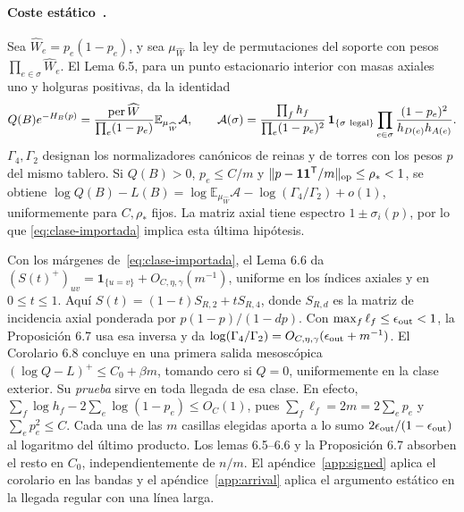 \paragraph{Coste estático~\cite[lemas 6.5--6.6, prop.~6.7 y cor.~6.8]{tc}.}
Sea \(\widehat W_e=p_e(1-p_e)\), y sea \(\mu_{\widehat W}\) la ley de permutaciones
del soporte con pesos \(\prod_{e\in\sigma}\widehat W_e\). El Lema 6.5, para un punto
estacionario interior con masas axiales uno y holguras positivas, da la identidad
\[
 Q(B)e^{-H_B(p)}=\frac{\operatorname{per}\widehat W}{\prod_e(1-p_e)}
                  \mathbb E_{\mu_{\widehat W}}\mathcal A,\qquad
 \mathcal A(\sigma)=
 \frac{\prod_f h_f}{\prod_e(1-p_e)^2}\,\mathbf1_{\{\sigma\ {\rm legal}\}}
 \prod_{e\in\sigma}\frac{(1-p_e)^2}{h_{D(e)}h_{A(e)}} .
\]
\(\Gamma_4,\Gamma_2\) designan los normalizadores canónicos de reinas y de torres con
los pesos \(p\) del mismo tablero. Si \(Q(B)>0\), \(p_e\le C/m\) y
\(\|p-\mathbf1\mathbf1^{\mathsf T}/m\|_{\rm op}\le\rho_*<1\), se obtiene
\(\log Q(B)-L(B)=\log\mathbb E_{\mu_{\widehat W}}\mathcal A
-\log(\Gamma_4/\Gamma_2)+o(1)\), uniformemente para \(C,\rho_*\) fijos.
La matriz axial tiene espectro \(1\pm\sigma_i(p)\), por lo que
\eqref{eq:clase-importada} implica esta última hipótesis.

Con los márgenes de~\eqref{eq:clase-importada}, el Lema 6.6 da
\((S(t)^+)_{uv}=\mathbf1_{\{u=v\}}+O_{C,\eta,\gamma}(m^{-1})\), uniforme en los
índices axiales y en \(0\le t\le1\). Aquí \(S(t)=(1-t)S_{R,2}+tS_{R,4}\), donde
\(S_{R,d}\) es la matriz de incidencia axial ponderada por \(p(1-p)/(1-dp)\).
Con \(\max_f\ell_f\le\epsilon_{\rm out}<1\), la Proposición 6.7 usa esa inversa y da
\(\log(\Gamma_4/\Gamma_2)=O_{C,\eta,\gamma}(\epsilon_{\rm out}+m^{-1})\).
El Corolario 6.8 concluye en una primera salida mesoscópica
\((\log Q-L)^+\le C_0+\beta m\), tomando cero si \(Q=0\), uniformemente en la clase exterior.
Su \emph{prueba} sirve en toda llegada de esa clase. En efecto,
\(\sum_f\log h_f-2\sum_e\log(1-p_e)\le O_C(1)\), pues
\(\sum_f\ell_f=2m=2\sum_e p_e\) y \(\sum_ep_e^2\le C\). Cada una de las \(m\)
casillas elegidas aporta a lo sumo \(2\epsilon_{\rm out}/(1-\epsilon_{\rm out})\)
al logaritmo del último producto. Los lemas 6.5--6.6 y la Proposición 6.7 absorben
el resto en \(C_0\), independientemente de \(n/m\). El apéndice~\ref{app:signed} aplica el
corolario en las bandas y el apéndice~\ref{app:arrival} aplica el argumento estático
en la llegada regular con una línea larga.
